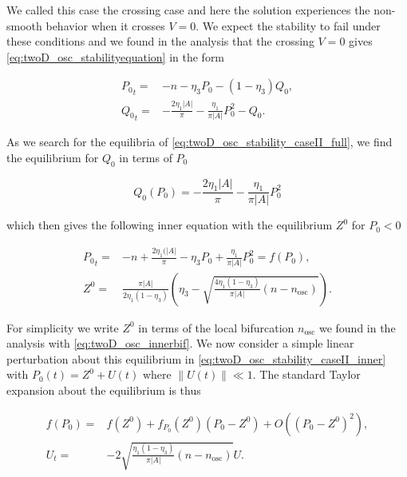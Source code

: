 We called this case the crossing case and here the solution experiences the non-smooth behavior when it crosses $V=0$. We expect the stability to fail under these conditions and we found in the analysis that the crossing $V=0$ gives \eqref{eq:twoD_osc_stabilityequation} in the form

\begin{equation}\label{eq:twoD_osc_stability_caseII_full}
\begin{aligned}
{P_0}_t =& -n-\eta_3 P_0-(1-\eta_3)Q_0,\\
{Q_0}_t =& -\frac{2\eta_1|A|}{\pi}-\frac{\eta_1}{\pi |A|}P_0^2-Q_0.
\end{aligned}
\end{equation}

As we search for the equilibria of \eqref{eq:twoD_osc_stability_caseII_full}, we find the equilibrium for $Q_0$ in terms of $P_0$ 

\begin{equation*}
Q_0(P_0)=-\frac{2\eta_1|A|}{\pi}-\frac{\eta_1}{\pi |A|}P_0^2
\end{equation*}

which then gives the following inner equation with the equilibrium $Z^0$ for $P_0<0$

\begin{equation}\label{eq:twoD_osc_stability_caseII_inner}
\begin{aligned}
{P_0}_t=&-n+\frac{2\eta_1(|A|}{\pi}-\eta_3 P_0+\frac{\eta_1}{\pi |A|}P_0^2=f(P_0),\\
Z^0=&\frac{\pi |A|}{2\eta_1(1-\eta_3)}\left(\eta_3-\sqrt{\frac{4\eta_1(1-\eta_3)}{\pi|A|}(n-n_{\text{osc}})}\right).
\end{aligned}
\end{equation}

For simplicity we write $Z^0$ in terms of the local bifurcation $n_{\text{osc}}$ we found in the analysis with \eqref{eq:twoD_osc_innerbif}. We now consider a simple linear perturbation about this equilibrium in \eqref{eq:twoD_osc_stability_caseII_inner} with $P_0(t)=Z^0+U(t)$ where $\lVert U(t)\rVert\ll 1$. The standard Taylor expansion about the equilibrium is thus

\begin{equation}\label{eqLtwoD_osc_stability_caseII_perturb}
\begin{aligned}
f(P_0)=&f(Z^0)+f_{P_0}(Z^0)(P_0-Z^0)+O((P_0-Z^0)^2),\\
U_t=&- 2\sqrt{\frac{\eta_1(1-\eta_3)}{\pi|A|}(n-n_{\text{osc}})}U.
\end{aligned}
\end{equation}

